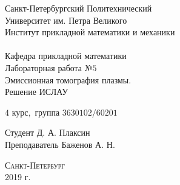 \documentclass[a4]{article}
\begin{document}
\def\contentsname{\LARGE{Содержание}}
\thispagestyle{empty}
\begin{center} 
\vspace{2cm} 
{\Large \sc Санкт-Петербургский Политехнический}\\
\vspace{2mm}
{\Large \sc Университет} им. {\Large\sc Петра Великого}\\
\vspace{1cm}
{\large \sc Институт прикладной математики и механики\\ 
\vspace{0.5mm}
\textsc{}}\\ 
\vspace{0.5mm}
{\large\sc Кафедра прикладной математики}\\
\vspace{15mm}
{\huge \sc Лабораторная работа №$5$\\
\vspace{4mm}
Эмиссионная томография плазмы.\\
\vspace{4mm}
Решение ИСЛАУ
\vspace{6mm}
 }
\vspace*{2mm}
\vspace{1cm}

{\sc $4$ курс$,$ группа $3630102/60201$}

\vspace{2cm} 
Студент \hfill Д. А. Плаксин\\
\vspace{1cm}
Преподаватель \hfill Баженов А. Н.\\
\vspace{20mm} 

\end{center} 
\begin{center}
\vfill {\large\textsc{Санкт-Петербург}}\\ 
2019 г.
\end{center}

\end{document}
